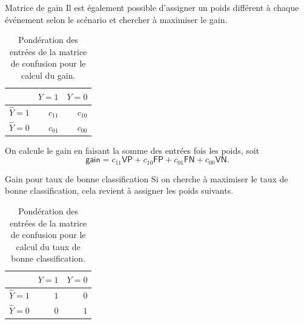 \documentclass[
  ignorenonframetext,
]{beamer}
\begin{document}
\begin{frame}{Matrice de gain}
\protect\hypertarget{matrice-de-gain}{}
Il est également possible d'assigner un poids différent à chaque
événement selon le scénario et chercher à maximiser le gain.

\hypertarget{tbl-tableconfumat4}{}
\begin{table}
\caption{\label{tbl-tableconfumat4}Pondération des entrées de la matrice de confusion pour le calcul du
gain. }\tabularnewline

\centering
\begin{tabular}{lrr}
\toprule
  & \(Y=1\) & \(Y=0\)\\
\midrule
\(\widehat{Y}=1\) & $c_{11}$ & $c_{10}$\\
\(\widehat{Y}=0\) & $c_{01}$ & $c_{00}$\\
\bottomrule
\end{tabular}
\end{table}

On calcule le gain en faisant la somme des entrées fois les poids, soit
\[\textsf{gain} = c_{11}\mathsf{VP} + c_{10}\mathsf{FP} + c_{01}\mathsf{FN} + c_{00}\mathsf{VN}.\]
\end{frame}

\begin{frame}{Gain pour taux de bonne classification}
\protect\hypertarget{gain-pour-taux-de-bonne-classification}{}
Si on cherche à maximiser le taux de bonne classification, cela revient
à assigner les poids suivants.

\hypertarget{tbl-tableconfumat3}{}
\begin{table}
\caption{\label{tbl-tableconfumat3}Pondération des entrées de la matrice de confusion pour le calcul du
taux de bonne classification. }\tabularnewline

\centering
\begin{tabular}{lrr}
\toprule
  & \(Y=1\) & \(Y=0\)\\
\midrule
\(\widehat{Y}=1\) & $1$ & $0$\\
\(\widehat{Y}=0\) & $0$ & $1$\\
\bottomrule
\end{tabular}
\end{table}
\end{frame}
\end{document}
